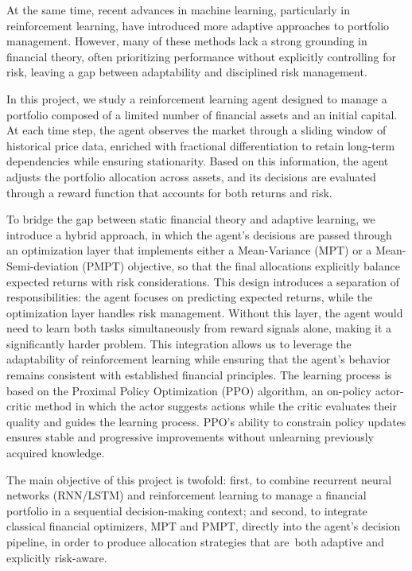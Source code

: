 \documentclass[final]{article}
\begin{document}
At the same time, recent advances in machine learning, particularly in reinforcement learning, have introduced more
adaptive approaches to portfolio management. However, many of these methods lack a strong grounding in financial theory,
often prioritizing performance without explicitly controlling for risk, leaving a gap between adaptability and disciplined
risk management.

In this project, we study a reinforcement learning agent designed to manage a portfolio composed of a limited number of
financial assets and an initial capital. At each time step, the agent observes the market through a sliding window of
historical price data, enriched with fractional differentiation to retain long-term dependencies while ensuring
stationarity. Based on this information, the agent adjusts the portfolio allocation across assets, and its decisions are
evaluated through a reward function that accounts for both returns and risk.

To bridge the gap between static financial theory and adaptive learning, we introduce a hybrid approach, in which the
agent's decisions are passed through an optimization layer that implements either a Mean-Variance (MPT) or a
Mean-Semi-deviation (PMPT) objective, so that the final allocations explicitly balance expected returns with risk
considerations. This design introduces a separation of responsibilities: the agent focuses on predicting
expected returns, while the optimization layer handles risk management. Without this layer,
the agent would need to learn both tasks simultaneously from reward signals alone, making it a significantly harder problem.
This integration allows us to leverage the adaptability of reinforcement learning while ensuring that the agent's behavior
remains consistent with established financial principles. The learning process is based on the
Proximal Policy Optimization (PPO) algorithm, an on-policy actor-critic method in which the actor suggests actions while
the critic evaluates their quality and guides the learning process. PPO's ability to constrain policy updates ensures
stable and progressive improvements without unlearning previously acquired knowledge.

The main objective of this project is twofold: first, to combine recurrent neural networks (RNN/LSTM) and reinforcement
learning to manage a financial portfolio in a sequential decision-making context; and second, to integrate classical financial
optimizers, MPT and PMPT, directly into the agent's decision pipeline, in order to produce allocation strategies that are\
both adaptive and explicitly risk-aware.
\end{document}

